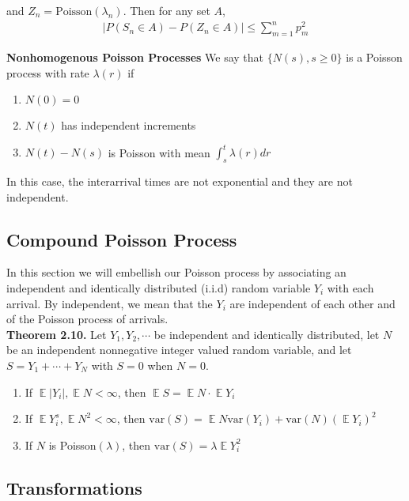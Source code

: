 \documentclass[12pt]{article}
\DeclareMathOperator*{\E}{\mathbb{E}}
\begin{document}
and $Z_n = \text{Poisson}(\lambda_n)$. Then for any set $A$,
\begin{align*}
|P(S_n \in A) - P(Z_n \in A)| \leq \sum_{m=1}^n p^2_m
\end{align*}

\textbf{Nonhomogenous Poisson Processes} We say that $\{N(s), s \geq 0\}$ is a Poisson process with rate $\lambda(r)$ if 
\begin{enumerate}
\item $N(0) = 0$
\item $N(t)$ has independent increments 
\item $N(t) - N(s)$ is Poisson with mean $\int_s^t \lambda(r) dr$
\end{enumerate}

In this case, the interarrival times are not exponential and they are not independent.

\subsection{Compound Poisson Process}

In this section we will embellish our Poisson process by associating an independent and identically distributed (i.i.d) random variable $Y_i$ with each arrival. By independent, we mean that the $Y_i$ are independent of each other and of the Poisson process of arrivals.\\

\textbf{Theorem 2.10.} Let $Y_1, Y_2, \cdots$ be independent and identically distributed, let $N$ be an independent nonnegative integer valued random variable, and let $S = Y_1 + \cdots + Y_N$ with $S = 0$ when $N = 0$.
\begin{enumerate}
\item If $\E | Y_i |, \E N < \infty$, then $\E S = \E N \cdot \E Y_i$
\item If $\E Y_i^s, \E N^2 < \infty$, then $\text{var}(S) = \E N \text{var}(Y_i) + \text{var}(N)(\E Y_i)^2$
\item If $N$ is Poisson$(\lambda)$, then $\text{var}(S) = \lambda \E Y_i^2$
\end{enumerate}


\subsection{Transformations}
\end{document}
